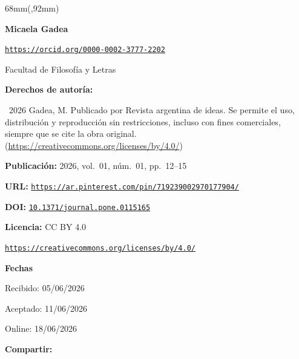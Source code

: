 \begin{textblock*}{68mm}(\gbbloquex,92mm)
{\setlength{\leftskip}{0pt}\setlength{\parindent}{0pt}%
\noindent\begin{minipage}[t]{68mm}
\sffamily\small\setlength{\parskip}{1pt}
{\bfseries\color{azulrevista}Micaela Gadea}\par
{\scriptsize\texttt{\href{https://orcid.org/0000-0002-3777-2202}{https://orcid.org/0000-0002-3777-2202}}}\par
Facultad de Filosofía y Letras\par
\vspace{6pt}
{\bfseries\color{azulrevista!70}Derechos de autor\'ia:}\par
\textcopyright\ 2026 Gadea, M. Publicado por Revista argentina de ideas. Se permite el uso, distribución y reproducción sin restricciones, incluso con fines comerciales, siempre que se cite la obra original. (\href{https://creativecommons.org/licenses/by/4.0/}{https://creativecommons.org/licenses/by/4.0/})\par\vspace{6pt}
{\bfseries\color{azulrevista!70}Publicación:} 2026, vol.~01, n\'um.~01, pp.~12--15\par\vspace{6pt}
{\bfseries\color{azulrevista!70}URL:} {\scriptsize\texttt{\href{https://ar.pinterest.com/pin/719239002970177904/}{https://ar.pinterest.com/pin/719239002970177904/}}}\par\vspace{6pt}
{\bfseries\color{azulrevista!70}DOI:} {\scriptsize\texttt{\href{https://doi.org/10.1371/journal.pone.0115165}{10.1371/journal.pone.0115165}}}\par\vspace{6pt}
{\bfseries\color{azulrevista!70}Licencia:} CC BY 4.0\par
{\scriptsize\texttt{\href{https://creativecommons.org/licenses/by/4.0/}{https://creativecommons.org/licenses/by/4.0/}}}\par
\vspace{6pt}
{\bfseries\color{azulrevista!70}Fechas}\par\vspace{2pt}
Recibido: 05/06/2026\par
Aceptado: 11/06/2026\par
Online: 18/06/2026\par
\vspace{6pt}
\vspace{6pt}
{\bfseries\color{azulrevista!70}Compartir:}\par\vspace{3pt}

\end{minipage}}
\end{textblock*}
